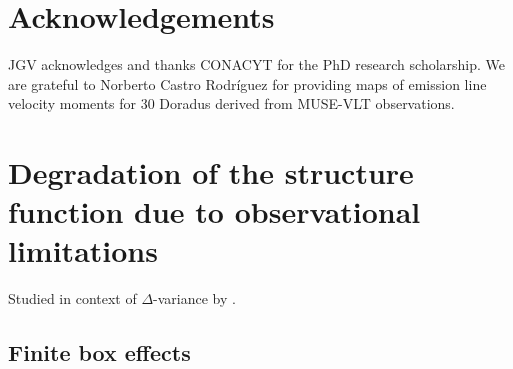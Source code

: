 \documentclass[fleqn,usenatbib, useAMS, a4paper]{mnras}
\begin{document}

\section*{Acknowledgements}

JGV acknowledges and thanks CONACYT for the PhD research scholarship. We are grateful to Norberto Castro Rodríguez for providing maps of emission line velocity moments for 30 Doradus derived from MUSE-VLT observations.







\appendix

\section{Degradation of the structure function due to observational limitations}
\label{sec:degr-struct-funct}
Studied in context of \(\Delta\)-variance by \citet{Bensch:2001l}.

\subsection{Finite box effects}
\label{sec:finite-box-effects}
\end{document}

